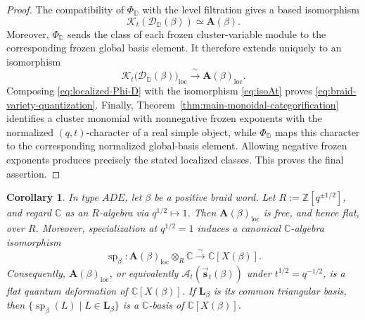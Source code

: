 \documentclass[12pt, reqno]{amsart}
\theoremstyle{plain}
\newtheorem{corollary}[theorem]{Corollary}
\theoremstyle{definition}
\numberwithin{equation}{section}
\newcommand{\ZZ}{\mathbb{Z}}
\newcommand{\CC}{\mathbb{C}}
\newcommand{\DD}{\mathbb{D}}
\begin{document}
\begin{proof}
The compatibility of \(\Phi_{\DD}\) with the level filtration gives
a based isomorphism
\begin{equation*}\mathcal{K}_t(\mathscr D_{\DD}(\beta))\simeq\mathbf A(\beta).\end{equation*}
Moreover, \(\Phi_{\DD}\) sends the class of each frozen
cluster-variable module to the corresponding frozen global basis
element. It therefore extends uniquely to an isomorphism
\begin{equation}\label{eq:localized-Phi-D}
    \mathcal{K}_t\bigl(\mathscr D_{\DD}(\beta)\bigr)_{\mathrm{loc}}
    \xrightarrow{\ \sim\ }
    \mathbf A(\beta)_{\mathrm{loc}}.
\end{equation}
Composing \eqref{eq:localized-Phi-D} with the isomorphism
\eqref{eq:isoAt} proves \eqref{eq:braid-variety-quantization}.
Finally, Theorem~\ref{thm:main-monoidal-categorification} identifies a
cluster monomial with nonnegative frozen exponents with the normalized
\((q,t)\)-character of a real simple object, while \(\Phi_{\DD}\) maps
this character to the corresponding normalized global-basis element.
Allowing negative frozen exponents produces precisely the stated localized
classes. This proves the final assertion.
\end{proof}

\begin{corollary}
\label{cor:classical-specialization-braid-variety}
In type \(ADE\), let $\beta$ be a positive braid word.
Let \(R:=\ZZ[q^{\pm1/2}]\), and regard \(\CC\) as an \(R\)-algebra
via \(q^{1/2}\mapsto1\). Then
\(\mathbf A(\beta)_{\mathrm{loc}}\) is free, and hence flat, over
\(R\). Moreover, specialization at
\(q^{1/2}=1\) induces a canonical \(\CC\)-algebra isomorphism
\begin{equation}
\label{eq:classical-specialization-braid-variety}
    \operatorname{sp}_\beta\colon
    \mathbf A(\beta)_{\mathrm{loc}}
    \otimes_R\CC
    \xrightarrow{\ \sim\ }
    \CC[X(\beta)].
\end{equation}
Consequently, \(\mathbf A(\beta)_{\mathrm{loc}}\), or equivalently
\(\mathcal A_t(\overrightarrow{\mathbf s}_t(\beta))\) under
\(t^{1/2}=q^{-1/2}\), is a flat quantum deformation of
\(\CC[X(\beta)]\). If \(\mathbf L_\beta\) is its common triangular
basis, then
\(
\{\operatorname{sp}_\beta(L)\mid L\in\mathbf L_\beta\}
\)
is a \(\CC\)-basis of \(\CC[X(\beta)]\).
\end{corollary}
\end{document}
